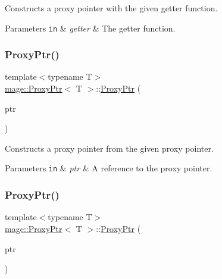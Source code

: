 Constructs a proxy pointer with the given getter function.


\begin{DoxyParams}[1]{Parameters}
\mbox{\tt in}  & {\em getter} & The getter function. \\
\hline
\end{DoxyParams}
\mbox{\label{classmage_1_1_proxy_ptr_aa31b385e10ba8ab7ce91791078e9ed6d}} 
\subsubsection{\texorpdfstring{Proxy\+Ptr()}{ProxyPtr()}\hspace{0.1cm}{\footnotesize\ttfamily [5/8]}}
{\footnotesize\ttfamily template$<$typename T$>$ \\
\mbox{\hyperlink{classmage_1_1_proxy_ptr}{mage\+::\+Proxy\+Ptr}}$<$ T $>$\+::\mbox{\hyperlink{classmage_1_1_proxy_ptr}{Proxy\+Ptr}} (\begin{DoxyParamCaption}\item[{const \mbox{\hyperlink{classmage_1_1_proxy_ptr}{Proxy\+Ptr}}$<$ T $>$ \&}]{ptr }\end{DoxyParamCaption})\hspace{0.3cm}{\ttfamily [noexcept]}}

Constructs a proxy pointer from the given proxy pointer.


\begin{DoxyParams}[1]{Parameters}
\mbox{\tt in}  & {\em ptr} & A reference to the proxy pointer. \\
\hline
\end{DoxyParams}
\mbox{\label{classmage_1_1_proxy_ptr_a51e4a025cd9ca419a2c4b687b4c430bb}} 
\subsubsection{\texorpdfstring{Proxy\+Ptr()}{ProxyPtr()}\hspace{0.1cm}{\footnotesize\ttfamily [6/8]}}
{\footnotesize\ttfamily template$<$typename T$>$ \\
\mbox{\hyperlink{classmage_1_1_proxy_ptr}{mage\+::\+Proxy\+Ptr}}$<$ T $>$\+::\mbox{\hyperlink{classmage_1_1_proxy_ptr}{Proxy\+Ptr}} (\begin{DoxyParamCaption}\item[{\mbox{\hyperlink{classmage_1_1_proxy_ptr}{Proxy\+Ptr}}$<$ T $>$ \&\&}]{ptr }\end{DoxyParamCaption})\hspace{0.3cm}{\ttfamily [noexcept]}}

